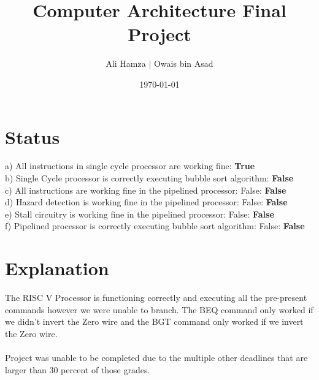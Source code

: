 \documentclass{article}
\title{Computer Architecture Final Project}
\author{Ali Hamza $|$ Owais bin Asad}
\date{\today}
\begin{document}
    \maketitle

    \section{Status}

            a) All instructions in single cycle processor are working fine: \textbf{True}\\
            b) Single Cycle processor is correctly executing bubble sort algorithm: \textbf{False}\\
            c) All instructions are working fine in the pipelined processor: False: \textbf{False}\\
            d) Hazard detection is working fine in the pipelined processor: False: \textbf{False}\\
            e) Stall circuitry is working fine in the pipelined processor: False: \textbf{False}\\
            f) Pipelined processor is correctly executing bubble sort algorithm: False: \textbf{False}\\

    \section{Explanation}

    The RISC V Processor is functioning correctly and executing all the pre-present commands however
    we were unable to branch. The BEQ command only worked if we didn't invert the Zero wire and the BGT command 
    only worked if we invert the Zero wire. \\\\ Project was unable to be completed due to the multiple other deadlines that are larger than 30 percent of those
    grades. 
        
\end{document}
